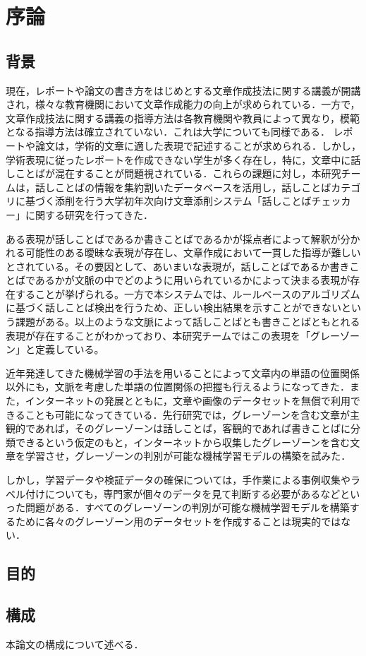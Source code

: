 \chapter{序論\label{c1}}

\section{背景}
現在，レポートや論文の書き方をはじめとする文章作成技法に関する講義が開講され，様々な教育機関において文章作成能力の向上が求められている．一方で，文章作成技法に関する講義の指導方法は各教育機関や教員によって異なり，模範となる指導方法は確立されていない．これは大学についても同様である．
レポートや論文は，学術的文章に適した表現で記述することが求められる．しかし，学術表現に従ったレポートを作成できない学生が多く存在し，特に，文章中に話しことばが混在することが問題視されている．これらの課題に対し，本研究チームは，話しことばの情報を集約割いたデータベースを活用し，話しことばカテゴリに基づく添削を行う大学初年次向け文章添削システム「話しことばチェッカー」に関する研究を行ってきた．

ある表現が話しことばであるか書きことばであるかが採点者によって解釈が分かれる可能性のある曖昧な表現が存在し、文章作成において一貫した指導が難しいとされている。その要因として、あいまいな表現が，話しことばであるか書きことばであるかが文脈の中でどのように用いられているかによって決まる表現が存在することが挙げられる。一方で本システムでは、ルールベースのアルゴリズムに基づく話しことば検出を行うため、正しい検出結果を示すことができないという課題がある。以上のような文脈によって話しことばとも書きことばともとれる表現が存在することがわかっており、本研究チームではこの表現を「グレーゾーン」と定義している。

近年発達してきた機械学習の手法を用いることによって文章内の単語の位置関係以外にも，文脈を考慮した単語の位置関係の把握も行えるようになってきた．また，インターネットの発展とともに，文章や画像のデータセットを無償で利用できることも可能になってきている．先行研究では，グレーゾーンを含む文章が主観的であれば，そのグレーゾーンは話しことば，客観的であれば書きことばに分類できるという仮定のもと，インターネットから収集したグレーゾーンを含む文章を学習させ，グレーゾーンの判別が可能な機械学習モデルの構築を試みた．

しかし，学習データや検証データの確保については，手作業による事例収集やラベル付けについても，専門家が個々のデータを見て判断する必要があるなどといった問題がある．すべてのグレーゾーンの判別が可能な機械学習モデルを構築するために各々のグレーゾーン用のデータセットを作成することは現実的ではない．

\section{目的}


\section{構成}
本論文の構成について述べる．
